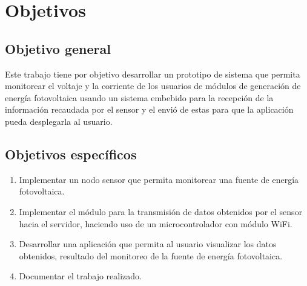 
\section{Objetivos}

\subsection{Objetivo general}
Este trabajo tiene por objetivo desarrollar un prototipo de sistema que permita monitorear el voltaje y la corriente de los usuarios de módulos de generación de energía fotovoltaica usando un sistema embebido para la recepción de la información recaudada por el sensor y el envió de estas para que la aplicación pueda desplegarla al usuario.

\subsection{Objetivos específicos}
\begin{enumerate}[label=\arabic*.]
    \item Implementar un nodo sensor que permita monitorear una fuente de energía fotovoltaica.
    \item Implementar el módulo para la transmisión de datos obtenidos por el sensor hacia el servidor, haciendo uso de un microcontrolador con módulo WiFi. 
    \item Desarrollar una aplicación que permita al usuario visualizar los datos obtenidos, resultado del monitoreo de la fuente de energía fotovoltaica.
    \item Documentar el trabajo realizado.
\end{enumerate}
